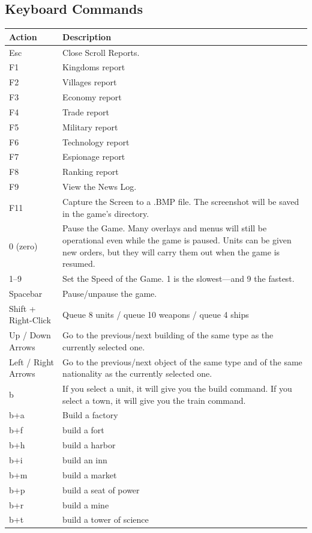 \clearpage

\subsection{Keyboard Commands}


\begin{center}
	\begin{tabular}{|p{1in}|p{3in}|}
		\hline	 
		Action	& Description \\ \hline
		Esc	& Close Scroll Reports. \\ \hline
		F1	& Kingdoms report \\ \hline
		F2	& Villages report \\ \hline
		F3	& Economy report \\ \hline
		F4	& Trade report \\ \hline
		F5	& Military report \\ \hline
		F6	& Technology report \\ \hline
		F7	& Espionage report \\ \hline
		F8	& Ranking report \\ \hline
		F9	& View the News Log. \\ \hline
		F11	& Capture the Screen to a .BMP file. The screenshot will be saved in the game’s directory. \\ \hline
		0 (zero) & Pause the Game. Many overlays and menus will still be operational even while the game is paused. Units can be given new orders, but they will carry them out when the game is resumed. \\ \hline
		1--9 & Set the Speed of the Game. 1 is the slowest---and 9 the fastest. \\ \hline
		Spacebar & Pause/unpause the game. \\ \hline
		Shift + Right-Click	& Queue 8 units / queue 10 weapons / queue 4 ships \\ \hline
		Up / Down Arrows & Go to the previous/next building of the same type as the currently selected one. \\ \hline
		Left / Right Arrows	& Go to the previous/next object of the same type and of the same nationality as the currently selected one. \\ \hline
		b & If you select a unit, it will give you the build command. If you select a town, it will give you the train command. \\ \hline
		b+a	& Build a factory \\ \hline
		b+f	& build a fort \\ \hline
		b+h	& build a harbor \\ \hline
		b+i	& build an inn \\ \hline
		b+m	& build a market \\ \hline
		b+p	& build a seat of power \\ \hline
		b+r	& build a mine \\ \hline
		b+t	& build a tower of science \\ \hline
	\end{tabular}
\end{center}

